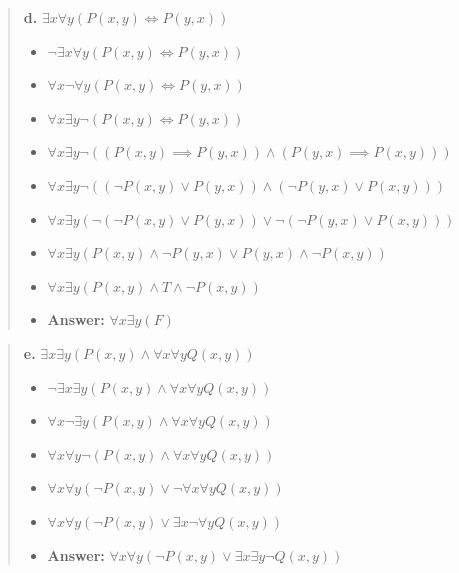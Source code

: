 \documentclass[11pt, oneside]{article}
\begin{document}
\begin{quote}
    \textbf{d. }$\exists x \forall y (P(x, y) \iff P(y, x))$

    \begin{itemize}
        \item $\neg \exists x \forall y (P(x, y) \iff P(y, x))$
        \item $\forall x \neg \forall y (P(x, y) \iff P(y, x))$
        \item $\forall x \exists y \neg (P(x, y) \iff P(y, x))$
        \item $\forall x \exists y \neg ((P(x, y) \implies P(y, x)) \land (P(y, x) \implies P(x, y)))$
        \item $\forall x \exists y \neg ((\neg P(x, y) \lor P(y, x)) \land (\neg P(y, x) \lor P(x, y)))$
        \item $\forall x \exists y (\neg (\neg P(x, y) \lor P(y, x)) \lor \neg (\neg P(y, x) \lor P(x, y)))$
        \item $\forall x \exists y (P(x, y) \land \neg P(y, x) \lor P(y, x) \land \neg P(x, y))$
        \item $\forall x \exists y (P(x, y) \land T \land \neg P(x, y))$
        \item \textbf{Answer:} $\forall x \exists y (F)$
    \end{itemize}
\end{quote}
\begin{quote}
    \textbf{e. }$\exists x \exists y (P(x, y) \land \forall x \forall y Q(x, y))$

    \begin{itemize}
        \item $\neg \exists x \exists y (P(x, y) \land \forall x \forall y Q(x, y))$
        \item $\forall x \neg \exists y (P(x, y) \land \forall x \forall y Q(x, y))$
        \item $\forall x \forall y \neg (P(x, y) \land \forall x \forall y Q(x, y))$
        \item $\forall x \forall y (\neg P(x, y) \lor \neg \forall x \forall y Q(x, y))$
        \item $\forall x \forall y (\neg P(x, y) \lor \exists x \neg \forall y Q(x, y))$
        \item \textbf{Answer:} $\forall x \forall y (\neg P(x, y) \lor \exists x \exists y \neg Q(x, y))$
    \end{itemize}
\end{quote}
\end{document}
